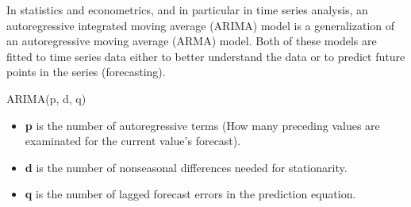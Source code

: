 In statistics and econometrics, and in particular in time series analysis, an autoregressive integrated moving average (ARIMA) model is a generalization of an autoregressive moving average (ARMA) model. Both of these models are fitted to time series data either to better understand the data or to predict future points in the series (forecasting).

ARIMA(p, d, q)
\begin{itemize}
\item \textbf{p} is the number of autoregressive terms (How many preceding values are examinated for the current value’s forecast).

\item \textbf{d} is the number of nonseasonal differences needed for stationarity.

\item \textbf{q} is the number of lagged forecast errors in the prediction equation. 
\end{itemize}


